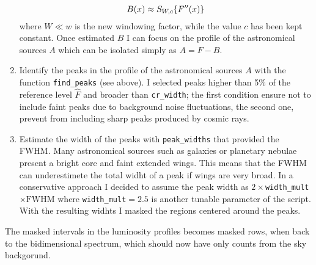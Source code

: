 \begin{enumerate}
	\begin{equation}
		B(x)\approx S_{W,c} \large\{ F''(x) \large\}
	\end{equation}
	where $W\ll w$ is the new windowing factor, while the value $c$ has been kept constant. Once estimated $B$ I can focus on the profile of the astronomical sources $A$ which can be isolated simply as $A=F-B$.
	\item Identify the peaks in the profile of the astronomical sources $A$ with the function \texttt{find\_peaks} (see above). I selected peaks higher than 5\% of the reference level $\hat F$ and broader than \texttt{cr\_width}; the first condition ensure not to include faint peaks due to background noise fluctuations, the second one, prevent from including sharp peaks produced by cosmic rays.
	\item Estimate the width of the peaks with \texttt{peak\_widths} that provided the FWHM. Many astronomical sources such as galaxies or planetary nebulae present a bright core and faint extended wings. This means that the FWHM can underestimete the total widht of a peak if wings are very broad. In a conservative approach I decided to assume the peak width as $2\times$\texttt{width\_mult}$\times\text{FWHM}$ where \texttt{width\_mult}$=2.5$ is another tunable parameter of the script. With the resulting widhts I masked the regions centered around the peaks.
\end{enumerate}
The masked intervals in the luminosity profiles becomes masked rows, when back to the bidimensional spectrum, which should now have only counts from the sky backgorund.

